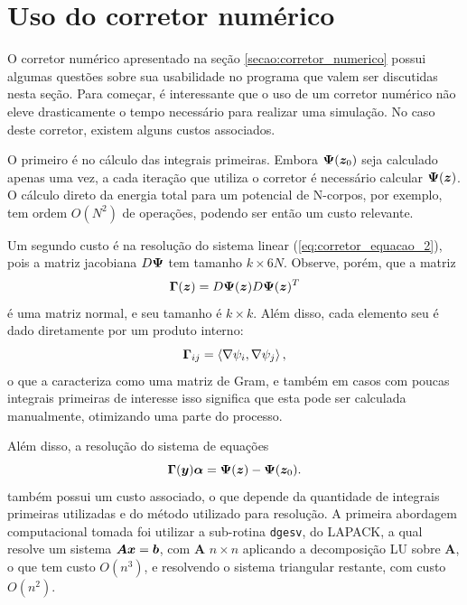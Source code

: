 \section{Uso do corretor numérico}\label{secao:uso_do_corretor}
O corretor numérico apresentado na seção \ref{secao:corretor_numerico} possui algumas questões sobre sua usabilidade no programa que valem ser discutidas nesta seção. Para começar, é interessante que o uso de um corretor numérico não eleve drasticamente o tempo necessário para realizar uma simulação. No caso deste corretor, existem alguns custos associados.

O primeiro é no cálculo das integrais primeiras. Embora $\bm \Psi(\bm z_0)$ seja calculado apenas uma vez, a cada iteração que utiliza o corretor é necessário calcular $\bm \Psi(\bm z)$. O cálculo direto da energia total para um potencial de N-corpos, por exemplo, tem ordem $O(N^2)$ de operações, podendo ser então um custo relevante.

Um segundo custo é na resolução do sistema linear (\ref{eq:corretor_equacao_2}), pois a matriz jacobiana $D \bm \Psi$ tem tamanho $k \times 6N$. Observe, porém, que a matriz
\begin{equation}\label{eq:corretor_matriz_normal}
    \bm \Gamma (\bm z) = D \bm \Psi(\bm z) D \bm \Psi(\bm z)^T
\end{equation}
é uma matriz normal, e seu tamanho é $k \times k$. Além disso, cada elemento seu é dado diretamente por um produto interno:
\begin{equation*}
    \bm \Gamma_{ij} = \left\langle \nabla \psi_i, \nabla \psi_j \right\rangle,
\end{equation*}
o que a caracteriza como uma matriz de Gram, e também em casos com poucas integrais primeiras de interesse isso significa que esta pode ser calculada manualmente, otimizando uma parte do processo. 

Além disso, a resolução do sistema de equações
\begin{equation*}
    \bm \Gamma (\bm y) \bm \alpha = \bm \Psi(\bm z) - \bm \Psi(\bm z_0).
\end{equation*}
também possui um custo associado, o que depende da quantidade de integrais primeiras utilizadas e do método utilizado para resolução. A primeira abordagem computacional tomada foi utilizar a sub-rotina \verb|dgesv|, do LAPACK, a qual resolve um sistema $\bm A \bm x = \bm b$, com $\bm A$ $n \times n$ aplicando a decomposição LU sobre $\bm A$, o que tem custo $O(n^3)$, e resolvendo o sistema triangular restante, com custo $O(n^2)$.

